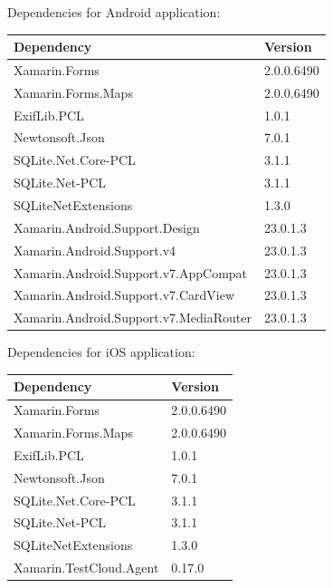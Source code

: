 \documentclass[12pt]{article}
\begin{document}
	Dependencies for Android application:
	\begin{table}[htbp]
		\begin{tabular}{ p{10cm}  p{2cm} }
			\textbf{Dependency} & \textbf{Version} \\ \hline
			Xamarin.Forms & 2.0.0.6490	 \\
			Xamarin.Forms.Maps & 2.0.0.6490	 \\
			ExifLib.PCL & 1.0.1 \\
			Newtonsoft.Json & 7.0.1 \\
			SQLite.Net.Core-PCL & 3.1.1 \\
			SQLite.Net-PCL & 3.1.1 \\
			SQLiteNetExtensions & 1.3.0 \\
			Xamarin.Android.Support.Design & 23.0.1.3\\
			Xamarin.Android.Support.v4 & 23.0.1.3 \\
			Xamarin.Android.Support.v7.AppCompat & 23.0.1.3 \\
			Xamarin.Android.Support.v7.CardView & 23.0.1.3\\
			Xamarin.Android.Support.v7.MediaRouter & 23.0.1.3\\
		\end{tabular}
	\end{table}
	\clearpage
	Dependencies for iOS application:
	\begin{table}[htbp]
		\begin{tabular}{ p{10cm}  p{2cm} }
			\textbf{Dependency} & \textbf{Version} \\ \hline
			Xamarin.Forms & 2.0.0.6490	 \\
			Xamarin.Forms.Maps & 2.0.0.6490	 \\
			ExifLib.PCL & 1.0.1 \\
			Newtonsoft.Json & 7.0.1 \\
			SQLite.Net.Core-PCL & 3.1.1 \\
			SQLite.Net-PCL & 3.1.1 \\
			SQLiteNetExtensions & 1.3.0 \\
			Xamarin.TestCloud.Agent & 0.17.0
		\end{tabular}
	\end{table}


	\clearpage
	
\end{document}
